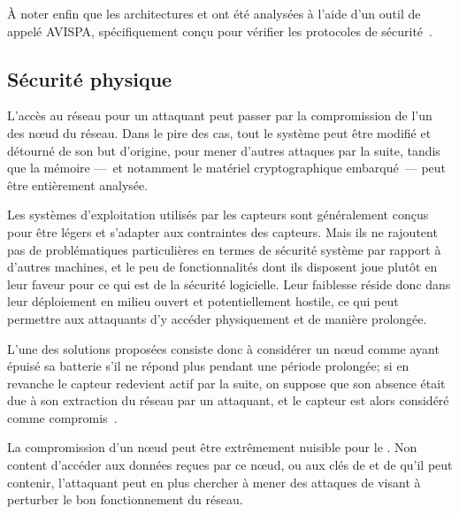 À noter enfin que les architectures  et  ont été analysées à l'aide d'un outil de  appelé AVISPA, spécifiquement conçu pour vérifier les protocoles de sécurité~\cite{TCCDC09}.

\subsection{Sécurité physique}

L'accès au réseau pour un attaquant peut passer par la compromission de l'un des nœud du réseau.
Dans le pire des cas, tout le système peut être modifié et détourné de son but d'origine, pour mener d'autres attaques par la suite, tandis que la mémoire ---~et notamment le matériel cryptographique embarqué~--- peut être entièrement analysée.

Les systèmes d'exploitation utilisés par les capteurs sont généralement conçus pour être légers et s'adapter aux contraintes des capteurs.
Mais ils ne rajoutent pas de problématiques particulières en termes de sécurité système par rapport à d'autres machines, et le peu de fonctionnalités dont ils disposent joue plutôt en leur faveur pour ce qui est de la sécurité logicielle.
Leur faiblesse réside donc dans leur déploiement en milieu ouvert et potentiellement hostile, ce qui peut permettre aux attaquants d'y accéder physiquement et de manière prolongée.

L'une des solutions proposées consiste donc à considérer un nœud comme ayant épuisé sa batterie s'il ne répond plus pendant une période prolongée; si en revanche le capteur redevient actif par la suite, on suppose que son absence était due à son extraction du réseau par un attaquant, et le capteur est alors considéré comme compromis~\cite{Ho10}.

La compromission d'un nœud peut être extrêmement nuisible pour le \rc.
Non content d'accéder aux données reçues par ce nœud, ou aux clés de  et de  qu'il peut contenir, l'attaquant peut en plus chercher à mener des attaques de \dds visant à perturber le bon fonctionnement du réseau.
